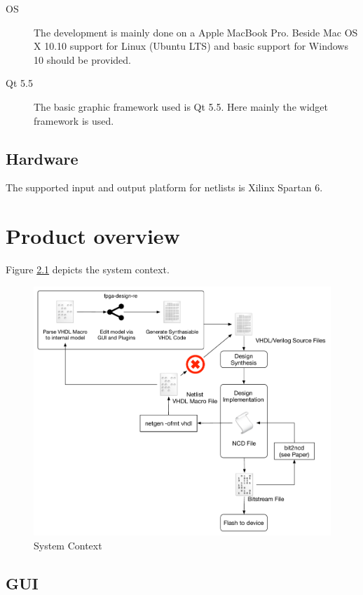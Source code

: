 \documentclass[a4paper]{scrreprt}
\begin{document}
\begin{description}
  \item[OS] The development is mainly done on a Apple MacBook Pro. Beside Mac OS X 10.10 support for Linux (Ubuntu LTS) and basic support for Windows 10 should be provided.
  \item[Qt 5.5] The basic graphic framework used is Qt 5.5. Here mainly the widget framework is used.
\end{description}

 
\section{Hardware}
The supported input and output platform for netlists is Xilinx Spartan 6.

\chapter{Product overview}

Figure \ref{img:context} depicts the system context.

\begin{figure}[hbt]
  \centering
  \includegraphics[scale=0.5]{images/Processes}
  \caption{System Context}
  \label{img:context}
\end{figure}
\newpage
\section{GUI}
\end{document}
